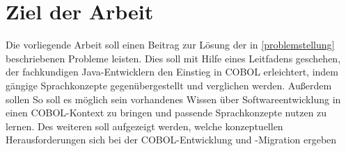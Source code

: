 \section{Ziel der Arbeit}
Die vorliegende Arbeit soll einen Beitrag zur Lösung der in \autoref{problemstellung} beschriebenen Probleme leisten. Dies soll mit Hilfe eines Leitfadens geschehen, der fachkundigen Java-Entwicklern den Einstieg in COBOL erleichtert, indem gängige Sprachkonzepte gegenübergestellt und verglichen werden. Außerdem sollen 
So soll es möglich sein vorhandenes Wissen über Softwareentwicklung in einen COBOL-Kontext zu bringen und passende Sprachkonzepte nutzen zu lernen. 
Des weiteren soll aufgezeigt werden, welche konzeptuellen Herausforderungen sich bei der COBOL-Entwicklung und -Migration ergeben